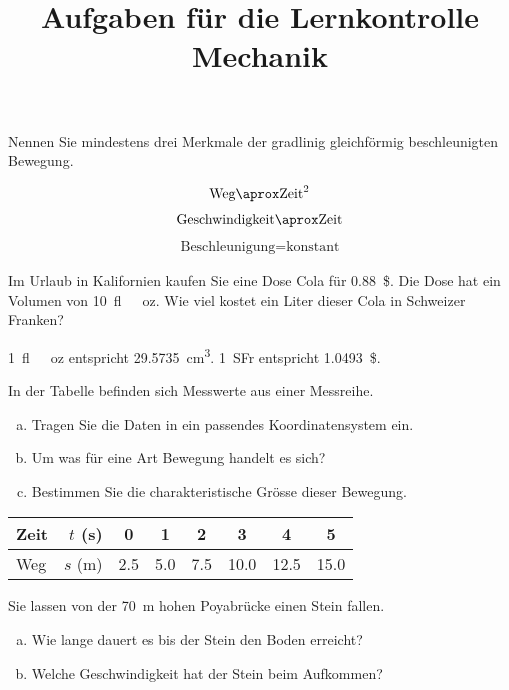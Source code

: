 \documentclass[12pt,a4paper,twoside]{article}
\title{Aufgaben für die Lernkontrolle Mechanik}
\date{}
\def\dir{/home/felix/GITHUB/Aufgaben_Mechanik/}
\newcommand{\Einbinden}[1]{}
\begin{document}
\maketitle

\begin{aufgabe}
	Nennen Sie mindestens drei Merkmale der gradlinig gleichförmig beschleunigten Bewegung.
	\begin{loesung}
		\begin{eqnarray*}
			\text{Weg}\aprox\text{Zeit}^2
		\end{eqnarray*}
		\begin{eqnarray*}
			\text{Geschwindigkeit}\aprox\text{Zeit}
		\end{eqnarray*}
		\begin{eqnarray*}
			\text{Beschleunigung} = \text{konstant}
		\end{eqnarray*}
	\end{loesung}
\end{aufgabe}



\begin{aufgabe}
	Im Urlaub in Kalifornien kaufen Sie eine Dose Cola für \SI{0.88}{\$}. 
	Die Dose hat ein Volumen von \SI{10}{fl\ oz}.
	Wie viel kostet ein Liter dieser Cola in Schweizer Franken?

	\SI{1}{fl\ oz} entspricht \SI{29,5735}{cm^3}.
	\SI{1}{SFr} entspricht \SI{1.0493}{\$}.

\end{aufgabe}

\begin{aufgabe}
In der Tabelle befinden sich Messwerte aus einer Messreihe.
\begin{enumerate} [a)]
	\item Tragen Sie die Daten in ein passendes Koordinatensystem ein.
	\item Um was für eine Art Bewegung handelt es sich?
	\item Bestimmen Sie die charakteristische Grösse dieser Bewegung.
\end{enumerate}

\begin{center}
	
	\begin{tabular}{l r |c c c c c c}
		Zeit & $t$ (s)	& 0         & 1         & 2         & 3          & 4          & 5\\\hline
		Weg  & $s$ (m) & \num{2.5} & \num{5.0} & \num{7.5} & \num{10.0} & \num{12.5} & \num{15.0} \\
	\end{tabular}
\end{center}
\end{aufgabe}

\Einbinden{\dir/kreis01.tex}


\begin{aufgabe}
	Sie lassen von der \SI{70}{m} hohen Poyabrücke einen Stein fallen.
	\begin{enumerate} [a)]
		\item Wie lange dauert es bis der Stein den Boden erreicht?
		\item Welche Geschwindigkeit hat der Stein beim Aufkommen?
	\end{enumerate}
\end{aufgabe}
\end{document}
